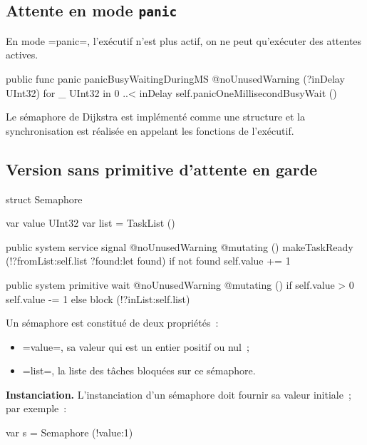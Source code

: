 \subsection{Attente en mode \texttt{panic}}

En mode \omnibus=panic=, l'exécutif n'est plus actif, on ne peut qu'exécuter des attentes actives.

\begin{OMNIBUS}
public func panic
panicBusyWaitingDuringMS @noUnusedWarning (?inDelay UInt32) {
  for _ UInt32 in 0 ..< inDelay {
    self.panicOneMillisecondBusyWait ()
  }
}
\end{OMNIBUS}














Le sémaphore de Dijkstra est implémenté comme une structure et la synchronisation est réalisée en appelant les fonctions de l'exécutif.


\subsection{Version sans primitive d'attente en garde}


\begin{OMNIBUS}
struct Semaphore {
  var value UInt32
  var list = TaskList ()

  public system service signal @noUnusedWarning @mutating () {
    makeTaskReady (!?fromList:self.list ?found:let found)
    if not found {
      self.value += 1
    }
  }

  public system primitive wait @noUnusedWarning @mutating () {
    if self.value > 0 {
      self.value -= 1
    }else{
      block (!?inList:self.list)
    }
  }
}
\end{OMNIBUS}

Un sémaphore est constitué de deux propriétés~:
\begin{itemize}
  \item \omnibus=value=, sa valeur qui est un entier positif ou nul~;
  \item \omnibus=list=, la liste des tâches bloquées sur ce sémaphore.
\end{itemize}


{\bf Instanciation.} L'instanciation d'un sémaphore doit fournir sa valeur initiale~; par exemple~:
\begin{OMNIBUS}
var s = Semaphore (!value:1)
\end{OMNIBUS}

